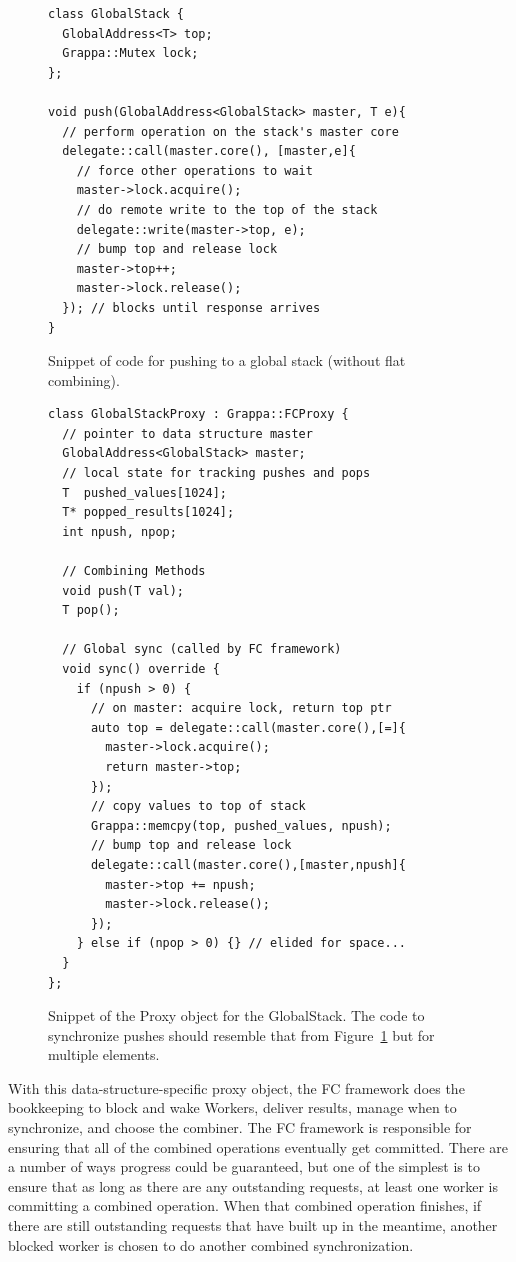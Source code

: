 \begin{figure}[t]
\centering
\begin{lstlisting}[style=grappa]
class GlobalStack {
  GlobalAddress<T> top;
  Grappa::Mutex lock;
};

void push(GlobalAddress<GlobalStack> master, T e){
  // perform operation on the stack's master core
  delegate::call(master.core(), [master,e]{
    // force other operations to wait
    master->lock.acquire();
    // do remote write to the top of the stack
    delegate::write(master->top, e);
    // bump top and release lock
    master->top++;
    master->lock.release();
  }); // blocks until response arrives
}
\end{lstlisting}
\caption{Snippet of code for pushing to a global stack (without flat combining).}
\label{fig:push}
\end{figure}

\begin{figure}[t]
\centering
\begin{lstlisting}[style=grappa]
class GlobalStackProxy : Grappa::FCProxy {
  // pointer to data structure master
  GlobalAddress<GlobalStack> master;
  // local state for tracking pushes and pops
  T  pushed_values[1024];
  T* popped_results[1024];
  int npush, npop;

  // Combining Methods 
  void push(T val);
  T pop();
  
  // Global sync (called by FC framework)
  void sync() override {
    if (npush > 0) {
      // on master: acquire lock, return top ptr
      auto top = delegate::call(master.core(),[=]{
        master->lock.acquire();
        return master->top;
      });
      // copy values to top of stack
      Grappa::memcpy(top, pushed_values, npush);
      // bump top and release lock
      delegate::call(master.core(),[master,npush]{
        master->top += npush;
        master->lock.release();
      });
    } else if (npop > 0) {} // elided for space...
  }
};
\end{lstlisting}
\caption{Snippet of the Proxy object for the GlobalStack. The code to synchronize pushes should resemble that from Figure~\ref{fig:push} but for multiple elements.}
\label{fig:proxy}
\end{figure}

With this data-structure-specific proxy object, the FC framework does the bookkeeping to block and wake Workers, deliver results, manage when to synchronize, and choose the combiner.
The FC framework is responsible for ensuring that all of the combined operations eventually get committed. There are a number of ways progress could be guaranteed, but one of the simplest is to ensure that as long as there are any outstanding requests, at least one worker is committing a combined operation.
When that combined operation finishes, if there are still outstanding requests that have built up in the meantime, another blocked worker is chosen to do another combined synchronization.

